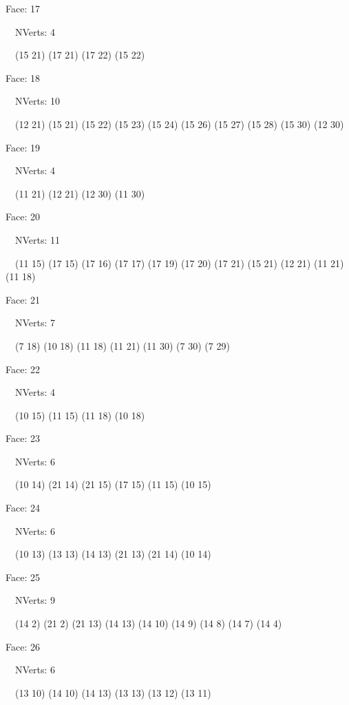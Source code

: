 \documentclass{article}
\begin{document}
{\footnotesize 

Face: 17

\   \    NVerts: 4

 \   \   (15 21) (17 21) (17 22) (15 22)}

{\footnotesize 

Face: 18

\   \    NVerts: 10

 \   \   (12 21) (15 21) (15 22) (15 23) (15 24) (15 26) (15 27) (15 28) (15 30) (12 30)}

{\footnotesize 

Face: 19

\   \    NVerts: 4

 \   \   (11 21) (12 21) (12 30) (11 30)}

{\footnotesize 

Face: 20

\   \    NVerts: 11

 \   \   (11 15) (17 15) (17 16) (17 17) (17 19) (17 20) (17 21) (15 21) (12 21) (11 21) (11 18)}

{\footnotesize 

Face: 21

\   \    NVerts: 7

 \   \   (7 18) (10 18) (11 18) (11 21) (11 30) (7 30) (7 29)}

{\footnotesize 

Face: 22

\   \    NVerts: 4

 \   \   (10 15) (11 15) (11 18) (10 18)}

{\footnotesize 

Face: 23

\   \    NVerts: 6

 \   \   (10 14) (21 14) (21 15) (17 15) (11 15) (10 15)}

{\footnotesize 

Face: 24

\   \    NVerts: 6

 \   \   (10 13) (13 13) (14 13) (21 13) (21 14) (10 14)}

{\footnotesize 

Face: 25

\   \    NVerts: 9

 \   \   (14 2) (21 2) (21 13) (14 13) (14 10) (14 9) (14 8) (14 7) (14 4)}

{\footnotesize 

Face: 26

\   \    NVerts: 6

 \   \   (13 10) (14 10) (14 13) (13 13) (13 12) (13 11)}
\end{document}
